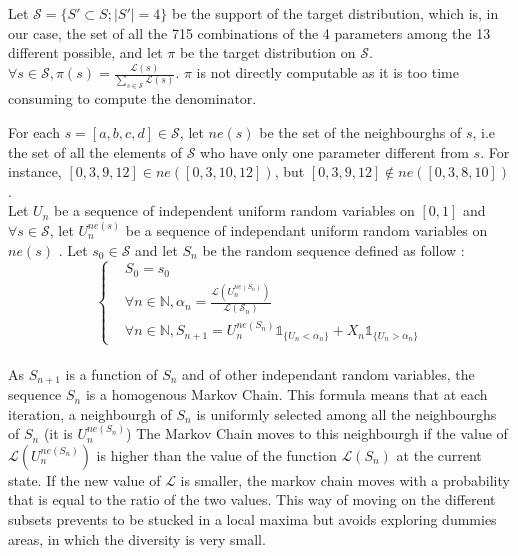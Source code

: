Let $\mathcal{S} = \{ S'\subset S ;  \vert S' \vert = 4 \}$ be the support of the target distribution, which is, in our case, the set of all the 715 combinations of the 4 parameters among the 13 different possible, and let $\pi$ be the target distribution on $\mathcal{S}$.
$\forall s \in \mathcal{S}, \pi(s) = \frac{\mathcal{L}(s)}{\sum_{s \in \mathcal{S}}  \mathcal{L}(s)} $. $\pi$ is not directly computable as it is too time consuming to compute the denominator.


For each $s = [a, b, c, d] \in \mathcal{S}$, let $ne(s)$ be the set of the neighbourghs of $s$, i.e the set of all the elements of $\mathcal{S}$ who have only one parameter different from $s$. 
For instance, $[0, 3, 9, 12] \in ne([0, 3, 10, 12])$, but $[0, 3, 9, 12] \notin ne([0, 3, 8, 10])$.\\

Let $U_n$ be a sequence of independent uniform random variables on $[0, 1]$ and $\forall s \in \mathcal{S}$, let $U_{n}^{ne(s)}$ be a sequence of independant uniform random variables on $ne(s)$ .
Let $s_0 \in \mathcal{S}$ and let  $S_n$ be the random sequence defined as follow : \\


\[
 \left\{
    \begin{aligned}
        & S_0 = s_0 \\
        & \forall n \in \mathbb{N}, \alpha_n = \frac{\mathcal{L}(U_{n}^{ne(S_n)})}{\mathcal{L}(\mathcal{S}_n)} \\
        & \forall n \in \mathbb{N}, S_{n+1} = U_{n}^{ne(S_n)} \mathbb{1}_{\{U_n < \alpha_n\}} + X_n \mathbb{1}_{\{U_n > \alpha_n\}}
\end{aligned}
\right.
\]
\\[0.5cm]

As $S_{n+1}$ is a function of $S_n$ and of other independant random variables, the sequence $S_n$ is a homogenous Markov Chain.
This formula means that at each iteration, a neighbourgh of $S_n$ is uniformly selected among all the neighbourghs of $S_n$ (it is $U_n^{ne(S_n)}$)
The Markov Chain moves to this neighbourgh if the value of  $\mathcal{L}(U_n^{ne(S_n)})$ is higher than the value of the function $\mathcal{L}(S_n)$ at the current state.
If the new value of $\mathcal{L}$ is smaller, the markov chain moves with a probability that is equal to the ratio of the two values.
This way of moving on the different subsets prevents to be stucked in a local maxima but avoids exploring dummies areas, in which the diversity is very small. \\

